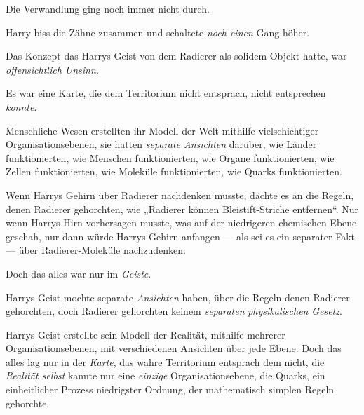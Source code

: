 Die Verwandlung ging noch immer nicht durch.

Harry biss die Zähne zusammen und schaltete \emph{noch einen} Gang höher.

Das Konzept das Harrys Geist von dem Radierer als solidem Objekt hatte, war \emph{offensichtlich Unsinn.}

Es war eine Karte, die dem Territorium nicht entsprach, nicht entsprechen \emph{konnte}.

Menschliche Wesen erstellten ihr Modell der Welt mithilfe vielschichtiger Organisationsebenen, sie hatten \emph{separate Ansichten} darüber, wie Länder funktionierten, wie Menschen funktionierten, wie Organe funktionierten, wie Zellen funktionierten, wie Moleküle funktionierten, wie Quarks funktionierten.

Wenn Harrys Gehirn über Radierer nachdenken musste, dächte es an die Regeln, denen Radierer gehorchten, wie
„Radierer können Bleistift-Striche entfernen“. Nur wenn Harrys Hirn vorhersagen musste, was auf der niedrigeren chemischen Ebene geschah, nur dann würde Harrys Gehirn anfangen — als sei es ein separater Fakt — über Radierer-Moleküle nachzudenken.

Doch das alles war nur im \emph{Geiste}.

Harrys Geist mochte separate \emph{Ansichten} haben, über die Regeln denen Radierer gehorchten, doch Radierer gehorchten keinem \emph{separaten} \emph{physikalischen} \emph{Gesetz}.

Harrys Geist erstellte sein Modell der Realität, mithilfe mehrerer Organisationsebenen, mit verschiedenen Ansichten über jede Ebene. Doch das alles lag nur in der \emph{Karte}, das wahre Territorium entsprach dem nicht, die \emph{Realität selbst} kannte nur eine \emph{einzige} Organisationsebene, die Quarks, ein einheitlicher Prozess niedrigster Ordnung, der mathematisch simplen Regeln gehorchte.

